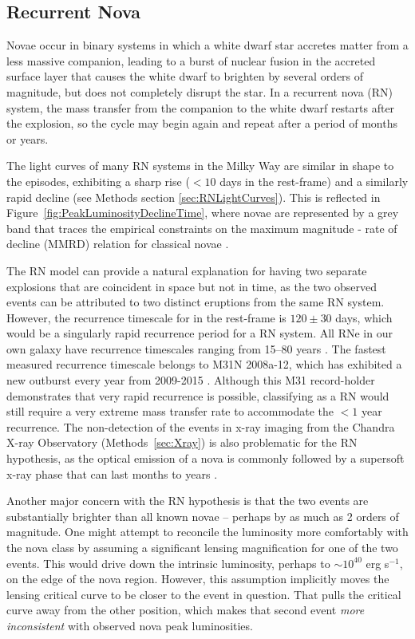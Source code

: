 \subsection{Recurrent Nova}\label{sec:RNe}

Novae occur in binary systems in which a white dwarf star accretes
matter from a less massive companion, leading to a burst of nuclear
fusion in the accreted surface layer that causes the white dwarf to
brighten by several orders of magnitude, but does not completely
disrupt the star. In a recurrent nova (RN) system, the mass transfer
from the companion to the white dwarf restarts after the explosion, so
the cycle may begin again and repeat after a period of months or
years.

The light curves of many RN systems in the Milky Way are similar in
shape to the \spock episodes, exhibiting a sharp rise ($<10$ days in
the rest-frame) and a similarly rapid decline (see Methods section
\ref{sec:RNLightCurves}).  This is reflected in
Figure~\ref{fig:PeakLuminosityDeclineTime}, where novae are
represented by a grey band that traces the empirical constraints on
the maximum magnitude - rate of decline (MMRD) relation for classical
novae \citep{DellaValle:1995, Downes:2000, Shafter:2011,
  Kasliwal:2011a}.

The RN model can provide a natural explanation for having two separate
explosions that are coincident in space but not in time, as the two
observed \spock events can be attributed to two distinct eruptions
from the same RN system.  However, the recurrence timescale for \spock
in the rest-frame is $120\pm30$ days, which would be a singularly
rapid recurrence period for a RN system.  All RNe in our own galaxy
have recurrence timescales ranging from 15--80 years
\citep{Schaefer:2010}.  The fastest measured recurrence timescale
belongs to M31N 2008a-12, which has exhibited a new outburst every
year from 2009-2015
\citep{Tang:2014,Darnley:2014,Darnley:2015,Henze:2015,Henze:2015a}. Although
this M31 record-holder demonstrates that very rapid recurrence is
possible, classifying \spock as a RN would still require a very
extreme mass transfer rate to accommodate the $<1$ year recurrence.
The non-detection of the \spock events in x-ray imaging from the
Chandra X-ray Observatory (Methods~\ref{sec:Xray}) is also problematic
for the RN hypothesis, as the optical emission of a nova is commonly
followed by a supersoft x-ray phase that can last months to years
\citep[e.g.][]{Hachisu:2006}.

Another major concern with the RN hypothesis is that the two \spock
events are substantially brighter than all known novae -- perhaps by
as much as 2 orders of magnitude.  One might attempt to reconcile the
\spock luminosity more comfortably with the nova class by assuming a
significant lensing magnification for one of the two events. This
would drive down the intrinsic luminosity, perhaps to $\sim10^{40}$
erg s$^{-1}$, on the edge of the nova region.  However, this
assumption implicitly moves the lensing critical curve to be closer to
the \spock event in question.  That pulls the critical curve away from
the other \spock position, which makes that second event {\it more
  inconsistent} with observed nova peak luminosities.

